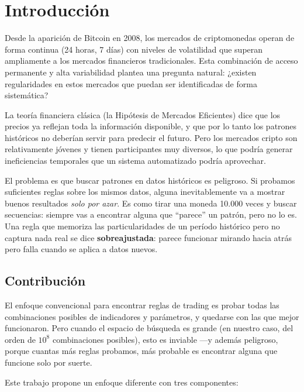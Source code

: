 \documentclass[12pt,a4paper]{article}
\begin{document}
\section{Introducción}
\label{sec:intro}

Desde la aparición de Bitcoin en 2008, los mercados de
criptomonedas operan de forma continua (24 horas, 7 días) con niveles de volatilidad
que superan ampliamente a los mercados financieros tradicionales. Esta combinación
de acceso permanente y alta variabilidad plantea una pregunta natural:
¿existen regularidades en estos mercados que puedan ser identificadas de forma
sistemática?

La teoría financiera clásica (la Hipótesis de Mercados Eficientes) dice que los
precios ya reflejan toda la información disponible, y que por lo tanto los patrones
históricos no deberían servir para predecir el futuro. Pero los mercados cripto son
relativamente jóvenes y tienen participantes muy diversos, lo que podría generar
ineficiencias temporales que un sistema automatizado podría aprovechar.

El problema es que buscar patrones en datos históricos es peligroso. Si probamos
suficientes reglas sobre los mismos datos, alguna inevitablemente va a mostrar buenos
resultados \textit{solo por azar}. Es como tirar una moneda 10.000 veces y buscar
secuencias: siempre vas a encontrar alguna que ``parece'' un patrón, pero no lo es.
Una regla que memoriza las particularidades de un período histórico pero no captura
nada real se dice \textbf{sobreajustada}: parece funcionar mirando hacia atrás pero
falla cuando se aplica a datos nuevos.

\subsection{Contribución}

El enfoque convencional para encontrar reglas de trading es probar todas las
combinaciones posibles de indicadores y parámetros, y quedarse con las que mejor
funcionaron. Pero cuando el espacio de búsqueda es grande (en nuestro caso, del
orden de $10^8$ combinaciones posibles), esto es inviable ---y además peligroso,
porque cuantas más reglas probamos, más probable es encontrar alguna que funcione
solo por suerte.

Este trabajo propone un enfoque diferente con tres componentes:
\end{document}
